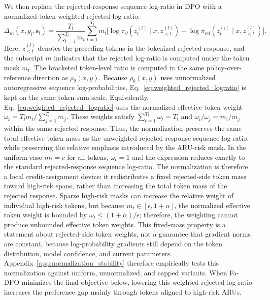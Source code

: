 \documentclass[a4paper,fleqn,doubleblind]{cas-sc}
\begin{document}
We then replace the rejected-response sequence log-ratio in DPO with a normalized token-weighted rejected log-ratio:
\begin{equation}
\label{eq:weighted_rejected_logratio}
\Delta_m(x,y_l,\mathbf{s}_l)
=
\frac{T_l}{\sum_{t=1}^{T_l} m_t}
\sum_{t=1}^{T_l}
m_t
\Big[
\log \pi_\theta(z^{(l)}_t \mid x, z^{(l)}_{<t})
-
\log \pi_{\text{ref}}(z^{(l)}_t \mid x, z^{(l)}_{<t})
\Big].
\end{equation}
Here, $z^{(l)}_{<t}$ denotes the preceding tokens in the tokenized rejected response, and the subscript $m$ indicates that the rejected log-ratio is computed under the token mask $m_t$. The bracketed token-level ratio is computed in the same policy-over-reference direction as $\rho_\theta(x,y)$. Because $\rho_\theta(x,y)$ uses unnormalized autoregressive sequence log-probabilities, Eq.~\ref{eq:weighted_rejected_logratio} is kept on the same token-sum scale. Equivalently, Eq.~\ref{eq:weighted_rejected_logratio} uses the normalized effective token weight $\omega_t=T_lm_t/\sum_{j=1}^{T_l}m_j$. These weights satisfy $\sum_{t=1}^{T_l}\omega_t=T_l$ and $\omega_i/\omega_j=m_i/m_j$ within the same rejected response. Thus, the normalization preserves the same total effective token mass as the unweighted rejected-response sequence log-ratio, while preserving the relative emphasis introduced by the ARU-risk mask. In the uniform case $m_t=c$ for all tokens, $\omega_t=1$ and the expression reduces exactly to the standard rejected-response sequence log-ratio. The normalization is therefore a local credit-assignment device: it redistributes a fixed rejected-side token mass toward high-risk spans, rather than increasing the total token mass of the rejected response. Sparse high-risk masks can increase the relative weight of individual high-risk tokens, but because $m_t\in[\epsilon,1+\alpha]$, the normalized effective token weight is bounded by $\omega_t\le (1+\alpha)/\epsilon$; therefore, the weighting cannot produce unbounded effective token weights. This fixed-mass property is a statement about rejected-side token weights, not a guarantee that gradient norms are constant, because log-probability gradients still depend on the token distribution, model confidence, and current parameters. Appendix~\ref{app:normalization_stability} therefore empirically tests this normalization against uniform, unnormalized, and capped variants. When Fa-DPO minimizes the final objective below, lowering this weighted rejected log-ratio increases the preference gap mainly through tokens aligned to high-risk ARUs.
\end{document}
